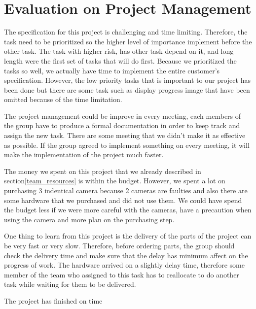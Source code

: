 \section{Evaluation on Project Management}

The specification for this project is challenging and time limiting.
Therefore, the task need to be prioritized so the higher level of importance implement before the other task.
The task with higher risk, has other task depend on it, and long length were the first set of tasks that will do first.
Because we prioritized the tasks so well, we actually have time to implement the entire customer's specification.
However, the low priority tasks that is important to our project has been done but there are some task such as display progress image that have been omitted because of the time limitation.

The project management could be improve in every meeting, each members of the group have to produce a formal documentation in order to keep track and assign the new task.
There are some meeting that we didn't make it as effective as possible.
If the group agreed to implement something on every meeting, it will make the implementation of the project much faster. 

The money we spent on this project that we already described in section\ref{team_resources} is within the budget.
However, we spent a lot on purchasing 3 indentical camera because 2 cameras are faulties and also there are some hardware that we purchased and did not use them.
We could have spend the budget less if we were more careful with the cameras, have a precaution when using the camera and more plan on the purchasing step.

One thing to learn from this project is the delivery of the parts of the project can be very fast or very slow. 
Therefore, before ordering parts, the group should check the delivery time and make sure that the delay has minimum affect on the progress of work.
The hardware arrived on a slightly delay time, therefore some member of the team who assigned to this task has to reallocate to do another task while waiting for them to be delivered.

The project has finished on time 













